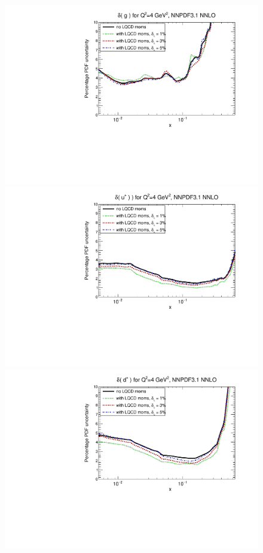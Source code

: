 \begin{figure}[!t]
\centering
\includegraphics[scale=0.45]{plots/xg-unpol-lattice-relerr.pdf}
\includegraphics[scale=0.45]{plots/xup-unpol-lattice-relerr.pdf}
\includegraphics[scale=0.45]{plots/xdp-unpol-lattice-relerr.pdf}

\end{figure}
